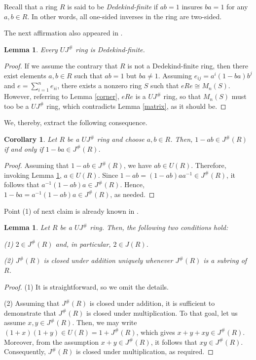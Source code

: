 \documentclass[12pt]{amsart}
\newtheorem{lemma}[theorem]{Lemma}
\newtheorem{corollary}[theorem]{Corollary}
\theoremstyle{definition}
\begin{document}
Recall that a ring $R$ is said to be {\it Dedekind-finite} if $ab=1$ insures $ba=1$ for any $a,b\in R$. In other words, all one-sided inverses in the ring are two-sided.

\medskip

The next affirmation also appeared in \cite{SU}.

\begin{lemma}\label{dedkind finite}
Every $UJ^{\#}$ ring is Dedekind-finite.
\end{lemma}

\begin{proof}
If we assume the contrary that $R$ is not a Dedekind-finite ring, then there exist elements $a, b \in R$ such that $ab = 1$ but $ba \neq 1$. Assuming $e_{ij} = a^i(1-ba)b^j$ and $e =\sum_{i=1}^{n}e_{ii}$, there exists a nonzero ring $S$ such that $eRe \cong M_n(S)$. However, referring to Lemma \ref{corner}, $eRe$ is a $UJ^{\#}$ ring, so that $M_n(S)$ must too be a $UJ^{\#}$ ring, which contradicts Lemma \ref{matrix}, as it should be.
\end{proof}

We, thereby, extract the following consequence.

\begin{corollary}
Let $R$ be a $UJ^{\#}$ ring and choose $a, b \in R$. Then, $1-ab \in J^{\#}(R)$ if and only if $1-ba \in J^{\#}(R)$.
\end{corollary}

\begin{proof}
Assuming that $1-ab \in J^{\#}(R)$, we have $ab \in U(R)$. Therefore, invoking Lemma \ref{dedkind finite}, $a \in U(R)$. Since $1-ab=(1-ab)aa^{-1} \in J^{\#}(R)$, it follows that $a^{-1}(1-ab)a \in J^{\#}(R)$. Hence, $1-ba=a^{-1}(1-ab)a \in J^{\#}(R)$, as needed.
\end{proof}

Point (1) of next claim is already known in \cite{SU}.

\begin{lemma}\label{2 in J(R)}
Let $R$ be a $UJ^{\#}$ ring. Then, the following two conditions hold:

(1) $2 \in J^{\#}(R)$ and, in particular, $2 \in J(R)$.

(2) $J^{\#}(R)$ is closed under addition uniquely whenever $J^{\#}(R)$ is a subring of $R$.

\end{lemma}

\begin{proof}
(1) It is straightforward, so we omit the details.

(2) Assuming that $J^{\#}(R)$ is closed under addition, it is sufficient to demonstrate that $J^{\#}(R)$ is closed under multiplication. To that goal, let us assume $x, y \in J^{\#}(R)$. Then, we may write
$(1+x)(1+y) \in U(R) = 1+J^{\#}(R)$, which gives $x+y+xy \in J^{\#}(R)$. Moreover, from the assumption $x+y\in J^{\#}(R)$, it follows that $xy \in J^{\#}(R)$. Consequently, $J^{\#}(R)$ is closed under multiplication, as required.
\end{proof}
\end{document}
